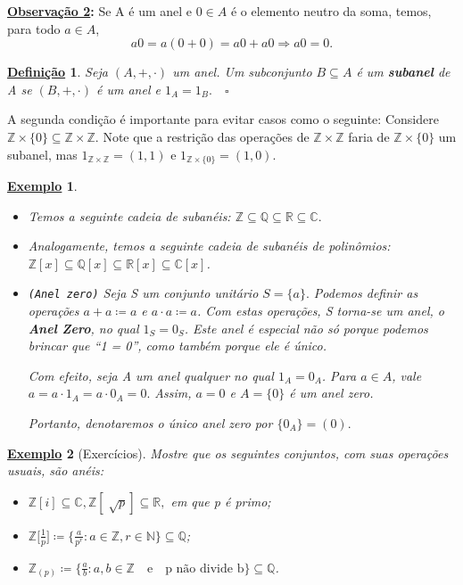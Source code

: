 \documentclass{article}
\newtheorem*{def*}{\underline{Defini\c c\~ao}}
\newtheorem{example}{\underline{Exemplo}}
\begin{document}
 \textbf{\underline{Observação 2}:} Se A é um anel e \(0\in A\) é o elemento neutro da soma, temos, para todo \(a\in A\), 
  \[
    a0 = a(0+0) = a0 + a0 \Rightarrow a0 = 0.
  \]
\begin{def*}
  Seja \((A, +, \cdot )\) um anel. Um subconjunto \(B\subseteq{A}\) é um \textbf{subanel} de A se \((B, +, \cdot )\) é um anel e \(1_{A} = 1_{B}.\quad\square\)
\end{def*}
  A segunda condição é importante para evitar casos como o seguinte: Considere \(\mathbb{Z}\times \{0\}\subseteq{\mathbb{Z}\times \mathbb{Z}}.\) Note que a restrição
das operações de \(\mathbb{Z}\times \mathbb{Z}\) faria de \(\mathbb{Z}\times \{0\}\) um subanel, mas \(1_{\mathbb{Z}\times \mathbb{Z}} = (1, 1)\) e \(1_{\mathbb{Z}\times\{0\}}=(1, 0).\)
\begin{example}
\begin{itemize}
  \item[i)] Temos a seguinte cadeia de subanéis: \(\mathbb{Z}\subseteq{\mathbb{Q}}\subseteq{\mathbb{R}}\subseteq{\mathbb{C}}.\)
  \item[ii)] Analogamente, temos a seguinte cadeia de subanéis de polinômios: \(\mathbb{Z}[x]\subseteq{\mathbb{Q}[x]}\subseteq{\mathbb{R}[x]}\subseteq{\mathbb{C}[x]}\).
  \item[iii)]\texttt{(Anel zero)} Seja S um conjunto unitário \(S = \{a\}.\) Podemos definir as operações \(a + a\coloneqq a\) e \(a \cdot a\coloneqq a\). Com estas operações,
S torna-se um anel, o \textbf{Anel Zero}, no qual \(1_{S} = 0_{S}\). Este anel é especial não só porque podemos brincar que ``1 = 0'', como também porque ele é \textit{único}.

  Com efeito, seja A um anel qualquer no qual \(1_{A} = 0_{A}\). Para \(a\in A\), vale \(a = a \cdot 1_{A} = a \cdot 0_{A} = 0.\) Assim, \(a = 0\) e \(A = \{0\}\) é 
um anel zero. 

  Portanto, denotaremos o único anel zero por \(\{0_{A}\} = (0).\)
\end{itemize}
\end{example}
\begin{example}[Exercícios]
  Mostre que os seguintes conjuntos, com suas operações usuais, são anéis:
\begin{itemize}
  \item[a)] \(\mathbb{Z}[i] \subseteq{\mathbb{C}}, \mathbb{Z}[\sqrt[]{p}]\subseteq{\mathbb{R}},\) em que p é primo;
  \item[b)] \(\mathbb{Z}\biggl[\frac{1}{p}\biggr]\coloneqq \biggl\{\frac{a}{p^{r}}: a\in \mathbb{Z}, r\in \mathbb{N}\biggr\}\subseteq{\mathbb{Q}}\);
  \item[c)] \(\mathbb{Z}_{(p)}\coloneqq \biggl\{\frac{a}{b}: a, b\in \mathbb{Z}\quad \text{e}\quad \text{p não divide b} \biggr\}\subseteq{\mathbb{Q}}\).
\end{itemize}
\end{example}
\end{document}
